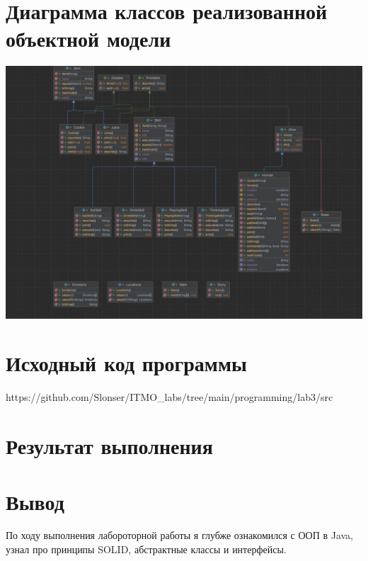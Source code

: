 \documentclass[12pt,onecolumn]{article}
\begin{document}
\section{Диаграмма классов реализованной объектной модели}
\includegraphics[width=\columnwidth]{diagram.jpg}
\newpage
\section{Исходный код программы}
https://github.com/Slonser/ITMO\_labs/tree/main/programming/lab3/src
\newpage
\section{Результат выполнения}

\newpage
\section{Вывод}
По ходу выполнения лабороторной работы я глубже ознакомился с ООП в Java, узнал про принципы SOLID, абстрактные классы и интерфейсы.
\end{document}

